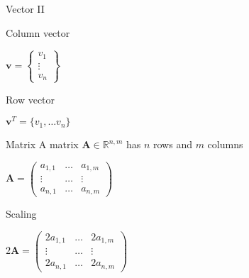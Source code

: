 \documentclass[\classoption]{beamer}
\begin{document}
\begin{frame}{Vector II}

\begin{block}{Column vector}
\begin{center}
$\mathbf{v} = \left\lbrace \begin{matrix}
v_1 \\ \vdots \\ v_n 
\end{matrix} \right\rbrace$
\end{center}
\end{block}

\begin{block}{Row vector}
\begin{center}
$\mathbf{v}^T = \lbrace v_1,\ldots v_n\rbrace$
\end{center}
\end{block}

\end{frame}


\begin{frame}{Matrix}
A matrix $\mathbf{A}\in \mathbb{R}^{n,m}$ has $n$ rows and $m$ columns
\begin{center}
$
\mathbf{A} = \begin{pmatrix}
a_{1,1} & \ldots & a_{1,m} \\
\vdots & \ldots & \vdots \\
a_{n,1} & \ldots & a_{n,m} 
\end{pmatrix}
$
\end{center}

\begin{block}{Scaling}
\begin{center}
$ 2 \mathbf{A} = \begin{pmatrix}
2a_{1,1} & \ldots & 2a_{1,m} \\
\vdots & \ldots & \vdots \\
2a_{n,1} & \ldots & 2a_{n,m} 
\end{pmatrix} $
\end{center}
\end{block}

\end{frame}
\end{document}
